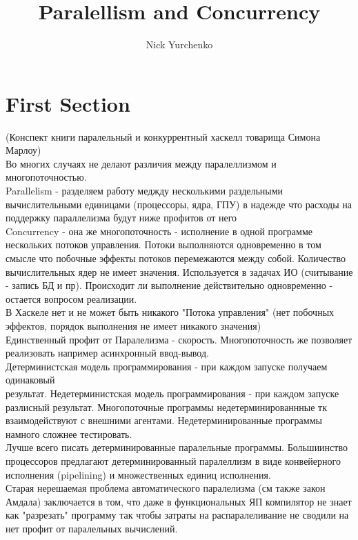 \documentclass[12pt,a4paper,draft]{article}
\author{Nick Yurchenko}
\title{Paralellism and Concurrency}
\begin{document}
\section{First Section}
(Конспект книги паралельный и конкуррентный хаскелл товарища Симона Марлоу)\\

Во многих случаях не делают различия между паралеллизмом и многопоточностью.\\

Parallelism - разделяем работу меджду несколькими раздельными вычислительными единицами (процессоры, ядра, ГПУ) в надежде что расходы на поддержку параллелизма будут ниже профитов от него\\

Concurrency - она же многопоточность - исполнение в одной программе нескольких потоков управления. Потоки выполняются одновременно в том смысле что побочные эффекты потоков перемежаются между собой. Количество вычислительных ядер не имеет значения. Используется в задачах ИО (считывание - запись БД и пр). Происходит ли выполнение действительно одновременно - остается вопросом реализации.\\

В Хаскеле нет и не может быть никакого "Потока управления" (нет побочных эффектов, порядок выполнения не имеет никакого значения)\\

Единственный профит от Паралелизма - скорость. Многопоточность же позволяет реализовать например асинхронный ввод-вывод. \\

Детерминистская модель программирования - при каждом запуске получаем одинаковый\\ результат. 
Недетерминистская модель программирования - при каждом запуске разлисный результат. Многопоточные программы недетерминированнные тк взаимодействуют с внешними агентами. Недетерминированные программы намного сложнее тестировать.\\

Лучше всего писать детерминированные паралельные программы. Большиинство процессоров предлагают детерминированный паралеллизм в виде конвейерного исполнения (pipelining) и множественных единиц исполнения. \\

Старая нерешаемая проблема автоматического паралелизма (см также закон Амдала) заключается в том, что даже в функциональных ЯП компилятор не знает как "разрезать" программу так чтобы затраты на распаралеливание не сводили на нет профит от паралельных вычислений.\\
\end{document}
